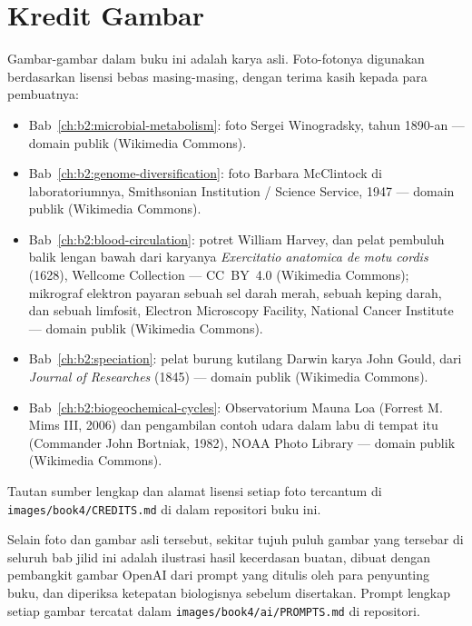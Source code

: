 \chapter*{Kredit Gambar}

\begingroup\sloppy

Gambar-gambar dalam buku ini adalah karya asli. Foto-fotonya digunakan
berdasarkan lisensi bebas masing-masing, dengan terima kasih kepada
para pembuatnya:

\begin{itemize}
  \item Bab~\ref{ch:b2:microbial-metabolism}: foto Sergei Winogradsky,
        tahun 1890-an --- domain publik (Wikimedia Commons).
  \item Bab~\ref{ch:b2:genome-diversification}: foto Barbara McClintock
        di laboratoriumnya, Smithsonian Institution / Science Service,
        1947 --- domain publik (Wikimedia Commons).
  \item Bab~\ref{ch:b2:blood-circulation}: potret William Harvey, dan
        pelat pembuluh balik lengan bawah dari karyanya
        \emph{Exercitatio anatomica de motu cordis} (1628), Wellcome
        Collection --- CC\ BY\ 4.0 (Wikimedia Commons); mikrograf
        elektron payaran sebuah sel darah merah, sebuah keping darah,
        dan sebuah limfosit, Electron Microscopy Facility, National
        Cancer Institute --- domain publik (Wikimedia Commons).
  \item Bab~\ref{ch:b2:speciation}: pelat burung kutilang Darwin karya
        John Gould, dari \emph{Journal of Researches} (1845) --- domain
        publik (Wikimedia Commons).
  \item Bab~\ref{ch:b2:biogeochemical-cycles}: Observatorium Mauna Loa
        (Forrest M. Mims III, 2006) dan pengambilan contoh udara dalam
        labu di tempat itu (Commander John Bortniak, 1982), NOAA Photo
        Library --- domain publik (Wikimedia Commons).
\end{itemize}

Tautan sumber lengkap dan alamat lisensi setiap foto tercantum di
\texttt{images/\allowbreak book4/\allowbreak CREDITS.md} di dalam repositori buku ini.

\bigskip
Selain foto dan gambar asli tersebut, sekitar tujuh puluh gambar yang
tersebar di seluruh bab jilid ini adalah ilustrasi hasil kecerdasan
buatan, dibuat dengan pembangkit gambar OpenAI dari prompt yang ditulis
oleh para penyunting buku, dan diperiksa ketepatan biologisnya sebelum
disertakan. Prompt lengkap setiap gambar tercatat dalam
\texttt{images/\allowbreak book4/\allowbreak ai/\allowbreak PROMPTS.md} di repositori.
\par\endgroup
\clearpage
